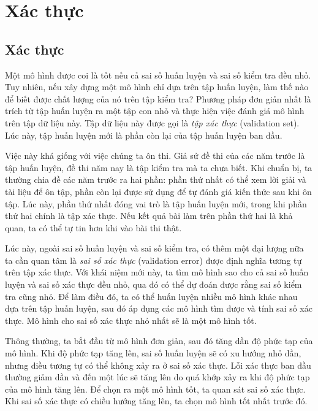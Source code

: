 \section{Xác thực}
\subsection{Xác thực}

Một mô hình được coi là tốt nếu cả sai số huấn luyện và sai số kiểm tra đều nhỏ. Tuy
nhiên, nếu xây dựng một mô hình {chỉ} dựa trên tập huấn luyện, làm thế nào để
biết được chất lượng của nó trên tập kiểm tra?
Phương pháp đơn giản nhất là {trích} từ tập huấn luyện ra một tập con nhỏ và
thực hiện việc đánh giá mô hình trên tập dữ liệu này. Tập dữ liệu này được gọi
là \textit{tập xác thực} ({validation set}). Lúc này, {tập huấn luyện mới
là phần còn lại của tập huấn luyện ban đầu}.

Việc này khá giống với việc chúng ta ôn thi. Giả sử đề thi của các năm trước là
tập huấn luyện, đề thi năm nay là tập kiểm tra mà ta chưa biết. Khi chuẩn bị,
ta thường chia đề các năm trước ra hai phần: phần thứ nhất có thể xem lời giải
và tài liệu để ôn tập, phần còn lại được sử dụng để tự đánh giá kiến thức sau
khi ôn tập. Lúc này, phần thứ nhất đóng vai trò là tập huấn luyện mới, trong khi
phần thứ hai chính là tập xác thực. Nếu kết quả bài làm trên phần thứ hai là
khả quan, ta có thể tự tin hơn khi vào bài thi thật.




Lúc này, ngoài sai số huấn luyện và sai số kiểm tra, có thêm một đại lượng nữa ta cần
quan tâm là \textit{sai số xác thực} (validation error) được định nghĩa tương tự trên tập xác thực.
Với khái niệm mới này, ta tìm mô hình sao cho cả {sai số huấn luyện} và {sai số xác thực}
đều nhỏ, qua đó có thể dự đoán được rằng {sai số kiểm tra} cũng nhỏ. Để làm điều
đó, ta có thể huấn luyện nhiều mô hình khác nhau dựa trên tập huấn luyện, sau đó
áp dụng các mô hình tìm được và tính {sai số xác thực}. Mô hình cho {sai số xác thực}
nhỏ nhất sẽ là một mô hình tốt.
 
Thông thường, ta bắt đầu từ mô hình đơn giản, sau đó tăng dần độ phức tạp của mô
hình. Khi độ phức tạp tăng lên, sai số huấn luyện sẽ có xu hướng nhỏ dần, nhưng
điều tương tự có thể không xảy ra ở sai số xác thực. Lỗi xác thực ban đầu
thường giảm dần và đến một lúc sẽ tăng lên do quá khớp xảy ra khi độ phức tạp của mô hình tăng lên. Để chọn ra một mô hình tốt, ta quan
sát sai số xác thực. Khi {sai số xác thực} có chiều hướng tăng lên, ta chọn mô hình tốt nhất trước đó.
 

